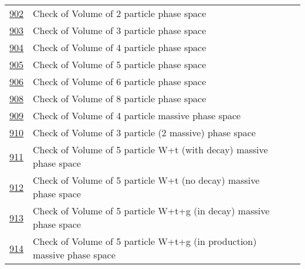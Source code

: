 \begin{center}
\begin{tabular}{|l|l|l|l|}
\href{\mcfmp/process902.html}{902} & Check of Volume of 2 particle phase space & & \\  
\href{\mcfmp/process903.html}{903} & Check of Volume of 3 particle phase space & & \\  
\href{\mcfmp/process904.html}{904} & Check of Volume of 4 particle phase space & & \\  
\href{\mcfmp/process905.html}{905} & Check of Volume of 5 particle phase space & & \\  
\href{\mcfmp/process906.html}{906} & Check of Volume of 6 particle phase space & & \\  
\href{\mcfmp/process908.html}{908} & Check of Volume of 8 particle phase space & & \\  
\href{\mcfmp/process909.html}{909} & Check of Volume of 4 particle massive phase space & & \\  
\href{\mcfmp/process910.html}{910} & Check of Volume of 3 particle (2 massive) phase space & & \\  
\href{\mcfmp/process911.html}{911} & Check of Volume of 5 particle W+t (with decay) massive phase space & & \\  
\href{\mcfmp/process912.html}{912} & Check of Volume of 5 particle W+t (no decay) massive phase space & & \\  
\href{\mcfmp/process913.html}{913} & Check of Volume of 5 particle W+t+g (in decay) massive phase space & & \\  
\href{\mcfmp/process914.html}{914} & Check of Volume of 5 particle W+t+g (in production) massive phase space & & \\  
\hline
\end{tabular}
\end{center}
